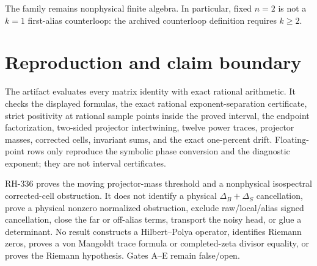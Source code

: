 \documentclass[11pt]{article}
\theoremstyle{remark}
\begin{document}
The family remains nonphysical finite algebra.  In particular, fixed
$n=2$ is not a $k=1$ first-alias counterloop: the archived counterloop
definition requires $k\ge2$.

\section{Reproduction and claim boundary}

The artifact evaluates every matrix identity with exact rational arithmetic.
It checks the displayed formulas, the exact rational exponent-separation
certificate, strict positivity at rational sample
points inside the proved interval, the endpoint factorization, two-sided
projector intertwining, twelve power traces, projector masses, corrected
cells, invariant sums, and the exact one-percent drift.  Floating-point rows
only reproduce the symbolic phase conversion and the diagnostic exponent;
they are not interval certificates.

RH-336 proves the moving projector-mass threshold and a nonphysical
isospectral corrected-cell obstruction.  It does not identify a physical
$\Delta_B+\Delta_S$ cancellation, prove a physical nonzero normalized
obstruction, exclude raw/local/alias signed cancellation, close the far or
off-alias terms, transport the noisy head, or glue a determinant.  No result
constructs a Hilbert--Polya operator, identifies Riemann zeros, proves a von
Mangoldt trace formula or completed-zeta divisor equality, or proves the
Riemann hypothesis.  Gates A--E remain false/open.



\end{document}
